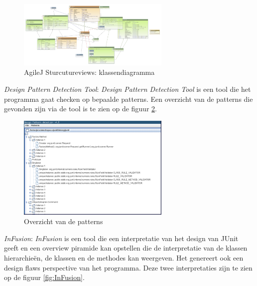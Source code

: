\documentclass[i1]{oss}
\begin{document}
\begin{description}
\begin{figure}[h!]
	\centering
	\includegraphics[width=0.65\textwidth]{AgileJKlassendiagramma}
	\caption{AgileJ Sturcutureviews: klassendiagramma}
	\label{fig:AgileJKlassendia}
\end{figure}

\item \emph{Design Pattern Detection Tool}: \emph{Design Pattern Detection Tool} is een tool die het programma gaat checken op bepaalde patterns. Een overzicht van de patterns die gevonden zijn via de tool is te zien op de figuur \ref{fig:DesignPatterns}. 

\begin{figure}[h!]
	\centering
	\includegraphics[width=0.65\textwidth]{Patterns1}
	\caption{Overzicht van de patterns}
	\label{fig:DesignPatterns}
\end{figure}

\item \emph{InFusion}: \emph{InFusion} is een tool die een interpretatie van het design van JUnit geeft en een overview piramide kan opstellen die de interpretatie van de klassen hierarchie\"en, de klassen en de methodes kan weergeven. Het genereert ook een design flaws perspective van het programma. Deze twee interpretaties zijn te zien op de figuur \ref{fig:InFusion}.




\end{description}
\end{document}
